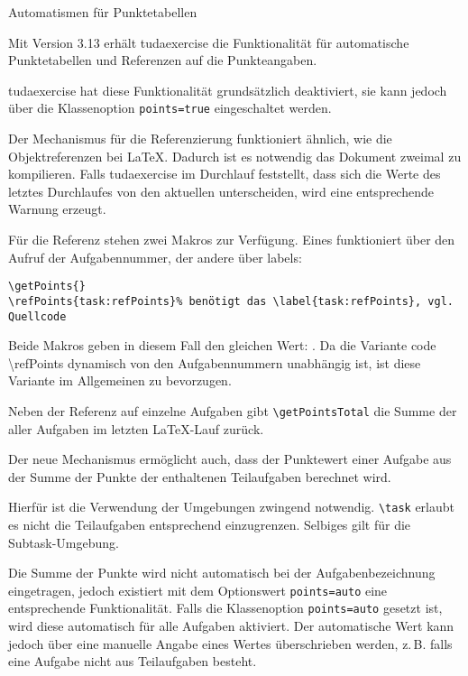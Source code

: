 \documentclass[
	german,%
	accentcolor=9c,%
	points=true, für die Aktivierung der Punktereferenzen
]{tudaexercise}
\newcommand*{\code}[1]{\texttt{#1}}
\newcommand*{\cls}[1]{\textsf{#1}}
\let\tbs\textbackslash
\begin{document}
\begin{task}[points=auto]{Automatismen für Punktetabellen}
	\label{task:refPoints}

	Mit Version 3.13 erhält  \cls{tudaexercise} die Funktionalität für automatische Punktetabellen und Referenzen auf die Punkteangaben.

	\begin{subtask}[points=3,title={Referenzen aktivieren}]
		\cls{tudaexercise} hat diese Funktionalität grundsätzlich deaktiviert, sie kann jedoch über die Klassenoption \code{points=true} eingeschaltet werden.

		Der Mechanismus für die Referenzierung funktioniert ähnlich, wie die Objektreferenzen bei \LaTeX{}. Dadurch ist es notwendig das Dokument zweimal zu kompilieren. Falls \cls{tudaexercise} im Durchlauf feststellt, dass sich die Werte des letztes Durchlaufes von den aktuellen unterscheiden, wird eine entsprechende Warnung erzeugt.

		Für die Referenz stehen zwei Makros zur Verfügung. Eines funktioniert über den Aufruf der Aufgabennummer, der andere über labels:

		\verb+\getPoints{+\thetask\verb+}+\\
		\verb+\refPoints{task:refPoints}% benötigt das \label{task:refPoints}, vgl. Quellcode+

		Beide Makros geben in diesem Fall den gleichen Wert: . Da die Variante code {\tbs{}refPoints} dynamisch von den Aufgabennummern unabhängig ist, ist diese Variante im Allgemeinen zu bevorzugen.

		Neben der Referenz auf einzelne Aufgaben gibt \code{\tbs{}getPointsTotal} die Summe der aller Aufgaben im letzten \LaTeX-Lauf zurück.

	\end{subtask}

	\begin{subtask}[points=2,title={Punkte aus Teilaufgaben aufsummieren}]
		Der neue Mechanismus ermöglicht auch, dass der Punktewert einer Aufgabe aus der Summe der Punkte der enthaltenen Teilaufgaben berechnet wird.

		Hierfür ist die Verwendung der Umgebungen zwingend notwendig. \code{\tbs{}task} erlaubt es nicht die Teilaufgaben entsprechend einzugrenzen. Selbiges gilt für die Subtask-Umgebung.

		Die Summe der Punkte wird nicht automatisch bei der Aufgabenbezeichnung eingetragen, jedoch existiert mit dem Optionswert \code{points=auto} eine entsprechende Funktionalität.
		Falls die Klassenoption \code{points=auto} gesetzt ist, wird diese automatisch für alle Aufgaben aktiviert. Der automatische Wert kann jedoch über eine manuelle Angabe eines Wertes überschrieben werden, z.\,B. falls eine Aufgabe nicht aus Teilaufgaben besteht.


\end{subtask}
\end{task}
\end{document}

